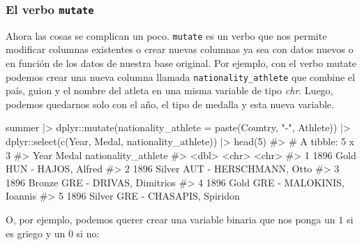 \documentclass[
  letterpaper,
  DIV=11,
  numbers=noendperiod,
  oneside]{scrreprt}
\newenvironment{Shaded}{\begin{snugshade}}{\end{snugshade}}
\newcommand{\AttributeTok}[1]{\textcolor[rgb]{0.40,0.45,0.13}{#1}}
\newcommand{\CommentTok}[1]{\textcolor[rgb]{0.37,0.37,0.37}{#1}}
\newcommand{\DecValTok}[1]{\textcolor[rgb]{0.68,0.00,0.00}{#1}}
\newcommand{\FunctionTok}[1]{\textcolor[rgb]{0.28,0.35,0.67}{#1}}
\newcommand{\NormalTok}[1]{\textcolor[rgb]{0.00,0.23,0.31}{#1}}
\newcommand{\SpecialCharTok}[1]{\textcolor[rgb]{0.37,0.37,0.37}{#1}}
\newcommand{\StringTok}[1]{\textcolor[rgb]{0.13,0.47,0.30}{#1}}
\begin{document}
\hypertarget{el-verbo-mutate}{%
\subsubsection{\texorpdfstring{El verbo
\texttt{mutate}}{El verbo mutate}}\label{el-verbo-mutate}}

Ahora las cosas se complican un poco. \texttt{mutate} es un verbo que
nos permite modificar columnas existentes o crear nuevas columnas ya sea
con datos nuevos o en función de los datos de nuestra base original. Por
ejemplo, con el verbo mutate podemos crear una nueva columna llamada
\texttt{nationality\_athlete} que combine el país, guion y el nombre del
atleta en una misma variable de tipo \emph{chr}. Luego, podemos quedarnos solo
con el año, el tipo de medalla y esta nueva variable.

\begin{Shaded}
\begin{Highlighting}[]
\NormalTok{summer }\SpecialCharTok{|\textgreater{}} 
\NormalTok{  dplyr}\SpecialCharTok{::}\FunctionTok{mutate}\NormalTok{(}\AttributeTok{nationality\_athlete =} \FunctionTok{paste}\NormalTok{(Country, }\StringTok{"{-}"}\NormalTok{, Athlete)) }\SpecialCharTok{|\textgreater{}} 
\NormalTok{  dplyr}\SpecialCharTok{::}\FunctionTok{select}\NormalTok{(}\FunctionTok{c}\NormalTok{(Year, Medal, nationality\_athlete)) }\SpecialCharTok{|\textgreater{}}
  \FunctionTok{head}\NormalTok{(}\DecValTok{5}\NormalTok{)}
\CommentTok{\#\textgreater{} \# A tibble: 5 x 3}
\CommentTok{\#\textgreater{}    Year Medal  nationality\_athlete     }
\CommentTok{\#\textgreater{}   \textless{}dbl\textgreater{} \textless{}chr\textgreater{}  \textless{}chr\textgreater{}                   }
\CommentTok{\#\textgreater{} 1  1896 Gold   HUN {-} HAJOS, Alfred     }
\CommentTok{\#\textgreater{} 2  1896 Silver AUT {-} HERSCHMANN, Otto  }
\CommentTok{\#\textgreater{} 3  1896 Bronze GRE {-} DRIVAS, Dimitrios }
\CommentTok{\#\textgreater{} 4  1896 Gold   GRE {-} MALOKINIS, Ioannis}
\CommentTok{\#\textgreater{} 5  1896 Silver GRE {-} CHASAPIS, Spiridon}
\end{Highlighting}
\end{Shaded}

O, por ejemplo, podemos querer crear una variable binaria que nos ponga
un \(1\) si es griego y un \(0\) si no:
\end{document}
